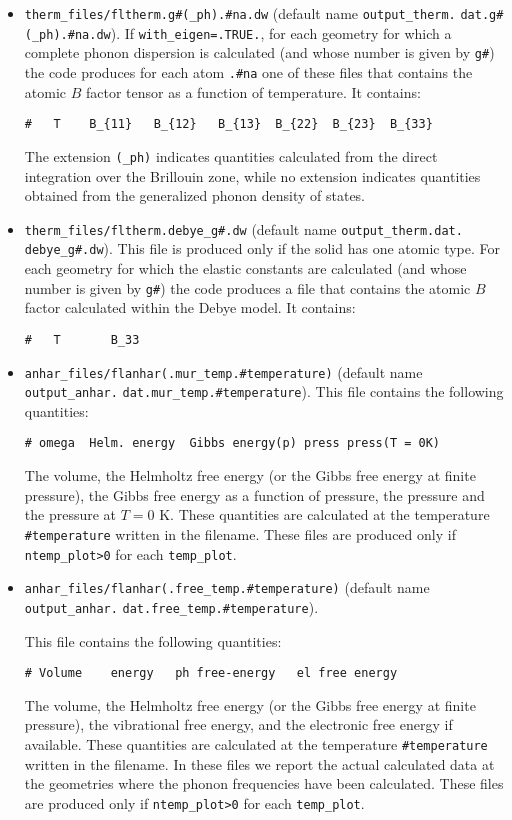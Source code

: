 \documentclass[12pt,a4paper,twoside]{report}
\begin{document}
\begin{itemize}
\item 
\texttt{therm\_files/fltherm.g\#(\_ph).\#na.dw} (default name 
\texttt{output\_therm.} \texttt{dat.g\#(\_ph).\#na.dw}). 
If \texttt{with\_eigen=.TRUE.}, for each geometry for which 
a complete phonon dispersion is calculated (and whose number is given
by \texttt{g\#}) the code produces for each atom \texttt{.\#na} one of these 
files that contains the atomic $B$ factor tensor as a function of 
temperature. It contains:
\begin{verbatim}
#   T    B_{11}   B_{12}   B_{13}  B_{22}  B_{23}  B_{33}
\end{verbatim}
The extension \texttt{(\_ph)} indicates 
quantities calculated from the direct integration over the Brillouin zone,
while no extension indicates quantities obtained from the generalized phonon 
density of states.

\item 
\texttt{therm\_files/fltherm.debye\_g\#.dw} (default name 
\texttt{output\_therm.dat.} \texttt{debye\_g\#.dw}). This file is produced
only if the solid has one atomic type. For each geometry for which 
the elastic constants are calculated (and whose number is given
by \texttt{g\#}) the code produces a file that contains 
the atomic $B$ factor calculated within the Debye model. It contains:
\begin{verbatim}
#   T       B_33 
\end{verbatim}

\item 
\texttt{anhar\_files/flanhar(.mur\_temp.\#temperature)} (default name \texttt{output\_anhar.} \texttt{dat.mur\_temp.\#temperature}).
This file contains the following quantities:
\begin{verbatim}
# omega  Helm. energy  Gibbs energy(p) press press(T = 0K)
\end{verbatim}
The volume, the Helmholtz free energy (or the Gibbs free
energy at finite pressure), the Gibbs free energy as a function of pressure,
the pressure and the pressure at $T = 0$ K.
These quantities are calculated at the temperature 
\texttt{\#temperature} written in the filename.
These files are produced only if \texttt{ntemp\_plot>0} for each
\texttt{temp\_plot}.

\item
\texttt{anhar\_files/flanhar(.free\_temp.\#temperature)} (default name \texttt{output\_anhar.} \texttt{dat.free\_temp.\#temperature}).

This file contains the following quantities:
\begin{verbatim}
# Volume    energy   ph free-energy   el free energy
\end{verbatim}
The volume, the Helmholtz free energy (or the Gibbs free
energy at finite pressure), the vibrational free energy,
and the electronic free energy if available.
These quantities are calculated at the temperature \texttt{\#temperature} 
written in the filename. In these files we report the actual calculated data
at the geometries where the phonon frequencies have been calculated.
These files are produced only if \texttt{ntemp\_plot>0} for each
\texttt{temp\_plot}. 


\end{itemize}
\end{document}
